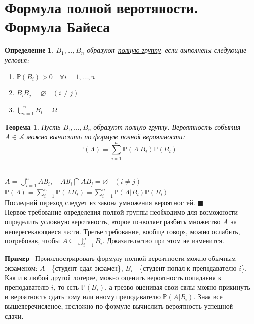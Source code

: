 \documentclass[12pt]{article}
\newtheorem{Th}{Теорема}
\newtheorem{Def}{Определение}
\newenvironment{Proof}{\par\noindent{\bf Доказательство}}{$\blacksquare$}
\newenvironment{Ex}{{\bf Пример}\ }{}
\numberwithin{Th}{section}
\numberwithin{Def}{section}
\numberwithin{Lem}{section}
\numberwithin{St}{section}
\numberwithin{equation}{section}
\newcommand\Pro{\mathbb{P}}
\newcommand\Ev{\mathscr{A}}
\begin{document}
\section{Формула полной веротяности. Формула Байеса}

\begin{Def}
$B_1, \ldots, B_n$ образуют \underline{полную группу}, если выполнены следующие условия:
	\begin{enumerate}
		\item $\Pro(B_i) > 0 \quad \forall i = 1, \ldots, n$
		\item $B_iB_j = \varnothing \quad (i \not= j)$
		\item $\bigcup\limits_{i=1}^nB_i = \Omega$
	\end{enumerate}
\end{Def}

\begin{Th}
Пусть $B_1, \ldots, B_n$ образуют полную группу. Вероятность события $A \in \Ev$ можно вычислить по \underline{формуле полной вероятности}:
$$\Pro(A) = \sum\limits_{i=1}^{n} \Pro(A|B_i)\Pro(B_i)$$
\end{Th}

\begin{Proof}
\\
$A=\bigcup\limits_{i=1}^{n}AB_i, \quad AB_i \bigcap AB_j = \varnothing \quad (i \not= j)$ \\
$\Pro(A) = \sum\limits_{i=1}^n \Pro(AB_i) = \sum\limits_{i=1}^{n} \Pro(A|B_i)\Pro(B_i)$ \\
Последний переход следует из  закона умножения вероятностей.
\end{Proof}
\\

Первое требование определения полной группы необходимо для возможности определить условную веротяность, второе позволяет 
разбить множество $A$ на непересекающиеся части. Третье требование, вообще говоря, можно ослабить, потребовав, чтобы $A \subseteq \bigcup\limits_{i=1}^nB_i$.
Доказательство при этом не изменится. 

\begin{Ex}
Проиллюстрировать формулу полной вероятности можно обычным экзаменом: $A$ - \{студент сдал экзамен\}, $B_i$ - \{студент попал к преподавателю $i$\}.
Как и в любой другой лотерее, можно оценить вероятность попадания к преподавателю $i$, то есть $\Pro(B_i)$, а трезво оценивая свои силы можно прикинуть 
и вероятность сдать тому или иному преподавателю $\Pro(A|B_i)$. Зная все вышеперечисленое, несложно по формуле вычислить вероятность успешной сдачи.
\end{Ex}
\\
\end{document}

